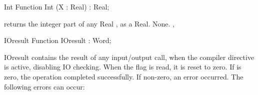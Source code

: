 \documentclass{report}
\begin{document}

\begin{function}{Int}
\Declaration
Function Int (X : Real) : Real;

\Description
{} returns the integer part of any Real , as a Real.
\Errors
None.
\SeeAlso
{}, 
\end{function}


\begin{function}{IOresult}
\Declaration
Function IOresult  : Word;

\Description
IOresult contains the result of any input/output call, when the
 compiler directive is active, disabling IO checking. 
When the flag is read, it is reset to zero.
If  is zero, the operation completed successfully. If
non-zero, an error occurred. The following errors can occur:


\end{function}
\end{document}
